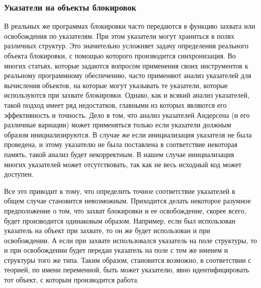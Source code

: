 \subsubsection{Указатели на объекты блокировок}
В реальных же программах блокировки часто передаются в функцию захвата или освобождения по указателям.
При этом указатели могут храниться в полях различных структур.
Это значительно усложняет задачу определения реального объекта блокировки, с помощью которого производится синхронизация.
Во многих статьях, которые задаются вопросом применения своих инструментов к реальному программному обеспечению, часто применяют анализ указателей для вычисления объектов, на которые могут указывать те указатели, которые используются при захвате блокировки.
Однако, как и всякий анализ указателей, такой подход имеет ряд недостатков, главными из которых являются его эффективность и точность.
Дело в том, что анализ указателей Андерсена (и его различные вариации) может применяться только если указатели должным образом инициализируются.
В случае же если инициализация указателя не была проведена, и этому указателю не была поставлена в соответствие некоторая память, такой анализ будет некорректным.
В нашем случае инициализация многих указателей может отсутствовать, так как не весь исходный код может доступен.

Все это приводит к тому, что определить точное соответствие указателей в общем случае становится невозможным.
Приходится делать некоторое разумное предположение о том, что захват блокировки и ее освобождение, скорее всего, будет производится одинаковым образом.
Например, если был использован указатель на объект при захвате, то он же будет использован и при освобождении.
А если при захвате использовался указатель на поле структуры, то и при освобождении будет передан указатель на поле с тем же именем и структуры того же типа.
Таким образом, становится возможно, в соответствии с теорией, по имени переменной, быть может указателю, явно идентифицировать тот объект, с которым производится работа.

